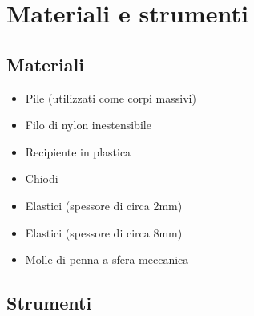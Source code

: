 \section*{Materiali e strumenti}
\subsection*{Materiali}
\begin{itemize}
  \item Pile (utilizzati come corpi massivi)
  \item Filo di nylon inestensibile
  \item Recipiente in plastica
  \item Chiodi
  \item Elastici (spessore di circa 2mm)
  \item Elastici (spessore di circa 8mm)
  \item Molle di penna a sfera meccanica
\end{itemize}

\subsection*{Strumenti}

